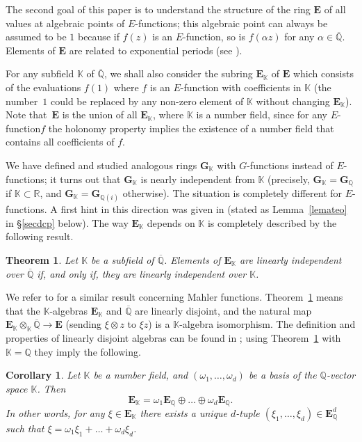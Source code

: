 \documentclass[11pt]{article}
\numberwithin{equation}{section}
\newcommand{\Efunction}{$E$\nobreakdash-func\-tion\xspace}
\newcommand{\Efunctions}{$E$\nobreakdash-func\-tions\xspace}
\newtheorem{theo}{Theorem}
\newtheorem{coro}{Corollary}
\theoremstyle{definition}
\newcommand{\Q}{\mathbb{Q}}
\newcommand{\R}{\mathbb{R}}
\newcommand{\K}{\mathbb{K}}
\newcommand{\GG}{{\mathbf G}}
\newcommand{\EE}{{\mathbf E}}
\newcommand{\Qbar}{\overline{\mathbb Q}}
\newcommand{\EK}{\EE_{\K}}
\newcommand{\EQ}{\EE_{\Q}}
\begin{document}
The second goal of this paper is to understand the structure of the ring $\EE $ of all values at algebraic points of \Efunctions; this algebraic point can always be assumed to be $1$ because if $f(z)$ is an \Efunction, so is $f(\alpha z)$ for any $\alpha\in \Qbar$. Elements of $\EE$ are related to exponential periods (see \cite[\S 4.3]{fuchsien}).

For any subfield $\mathbb K$ of $\Qbar$, we shall also consider the subring $\EK$ of $\EE$ which consists of the evaluations $f(1)$ where $f$ is an \Efunction with coefficients in $\mathbb K$ (the number~$1$ could be replaced by any non-zero element of $\mathbb K$ without changing $\EK$).
Note that~$\EE$ is the union of all $\EK$, where $\K$ is a number field, since for any \Efunction $f$ the holonomy property implies the existence of a number field that contains all coefficients of $f$.

We have defined and studied \cite{gvalues} analogous rings $\GG_\K$ with $G$-functions instead of \Efunctions; it turns out that $\GG_\K$ is nearly independent from $\K$ (precisely, $\GG_\K= \GG_\Q$ if $\K\subset\R$, and $\GG_\K=\GG_{\Q(i)}$ otherwise). The situation is completely different for \Efunctions. A first hint in this direction was given in \cite[Th.\,4]{ateo} (stated as Lemma~\ref{lemateo} in \S \ref{secdcp} below). The way $\EK$ depends on $\K$ is completely described by the following result.

\begin{theo} \label{theotens} Let $\K$ be a subfield of $\Qbar$.
Elements of $\EK$ are linearly independent over $\Qbar$ if, and only if, they are linearly independent over $\K$.
\end{theo}

We refer to \cite[Th.\,1.7]{AF} for a similar result concerning Mahler functions.
Theorem~\ref{theotens} means that the $\K$-algebras $\EK$ and $\Qbar$ are linearly disjoint, and the natural map $\EK\otimes_\K \Qbar \to \EE $ (sending $\xi\otimes z$ to $\xi z$) is a $\K$-algebra isomorphism.
The definition and properties of linearly disjoint algebras can be found in \cite[Ch.\,V, \S 2, No.\,5]{Bourbaki}; using Theorem~\ref{theotens} with $\K=\Q$ they imply the following.

\begin{coro}\label{cordcp}
Let $\K$ be a number field, and $(\omega_1,\ldots,\omega_d)$ be a basis of the $\Q$-vector space $\K$. Then
\[
\EK = \omega_1 \EQ\oplus \ldots \oplus \omega_d \EQ.
\]
In other words, for any $\xi\in\EK$
there exists a unique $d$-tuple $(\xi_1,\ldots,\xi_d)\in\EQ^d$ such that $\xi = \omega_1\xi_1+\ldots+\omega_d\xi_d$.
\end{coro}
\end{document}
